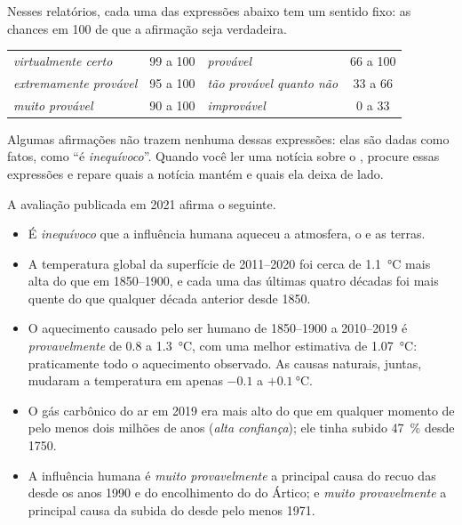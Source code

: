 Nesses relatórios, cada uma das expressões abaixo tem um sentido fixo: as
chances em 100 de que a afirmação seja verdadeira.

\begin{center}
{\small
\begin{tabular}{|l|c||l|c|}
\hline
\emph{virtualmente certo} & 99 a 100 & \emph{provável} & 66 a 100 \\
\emph{extremamente provável} & 95 a 100 & \emph{tão provável quanto não} & 33 a 66 \\
\emph{muito provável} & 90 a 100 & \emph{improvável} & 0 a 33 \\
\hline
\end{tabular}}
\end{center}

\noindent Algumas afirmações não trazem nenhuma dessas expressões: elas
são dadas como fatos, como ``é \emph{inequívoco}''. Quando você ler uma
notícia sobre o , procure essas expressões e repare quais a notícia
mantém e quais ela deixa de lado.

A avaliação publicada em 2021 afirma o seguinte.
\begin{itemize}
  \item É \emph{inequívoco} que a influência humana aqueceu a atmosfera,
        o  e as terras.
  \item A temperatura global da superfície de 2011--2020 foi cerca de
        \qty{1.1}{\degreeCelsius} mais alta do que em 1850--1900, e cada
        uma das últimas quatro décadas foi mais quente do que qualquer
        década anterior desde 1850.
  \item O aquecimento causado pelo ser humano de 1850--1900 a 2010--2019
        é \emph{provavelmente} de 0.8 a \qty{1.3}{\degreeCelsius}, com
        uma melhor estimativa de \qty{1.07}{\degreeCelsius}: praticamente
        todo o aquecimento observado. As causas naturais, juntas,
        mudaram a temperatura em apenas $-0.1$ a $+\qty{0.1}{\degreeCelsius}$.
  \item O gás carbônico do ar em 2019 era mais alto do que em qualquer
        momento de pelo menos dois milhões de anos (\emph{alta
        confiança}); ele tinha subido 47~\% desde 1750.
  \item A influência humana é \emph{muito provavelmente} a principal
        causa do recuo das  desde os anos 1990 e do encolhimento
        do  do Ártico; e \emph{muito provavelmente} a
        principal causa da subida do  desde pelo menos 1971.
\end{itemize}

